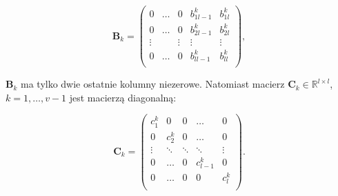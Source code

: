 \documentclass{article}
\begin{document}
\begin{center}
    $$
    \mathbf{B}_{k} = 
    \begin{pmatrix}
        0 & \ldots & 0 & b_{1l-1}^{k} & b_{1l}^{k} \\
        0 & \ldots & 0 & b_{2l-1}^{k}  & b_{2l}^{k} \\    
        \vdots &  & \vdots & \vdots & \vdots \\
        0 & \ldots & 0 & b_{ll-1}^{k} & b_{ll}^{k} \\    
    \end{pmatrix},
    $$
\end{center}
$\mathbf{B}_{k}$ ma tylko dwie ostatnie kolumny niezerowe. Natomiast macierz $\mathbf{C}_{k} \in \mathbb{R}^{l \times l}$, $k = 1, \ldots, v - 1$ jest macierzą diagonalną:
\begin{center}
    $$
    \mathbf{C}_{k} = 
    \begin{pmatrix}
        c_{1}^{k} & 0 & 0 & \ldots & 0 \\
        0 & c_{2}^{k} & 0 & \ldots & 0 \\
        \vdots & \ddots & \ddots & \ddots & \vdots \\
        0 & \ldots & 0 & c_{l-1}^{k} & 0 \\
        0 & \ldots & 0 & 0 & c_{l}^{k} \\
    \end{pmatrix}.
    $$
\end{center}
\end{document}

